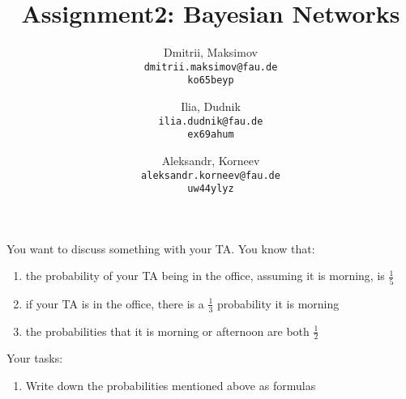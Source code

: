 \documentclass{homework}
\title{Assignment2: Bayesian Networks}
\author{
  Dmitrii, Maksimov\\
  \texttt{dmitrii.maksimov@fau.de} \\
  \texttt{ko65beyp}
  \and
  Ilia, Dudnik\\
  \texttt{ilia.dudnik@fau.de}\\
  \texttt{ex69ahum}
  \and
  Aleksandr, Korneev\\
  \texttt{aleksandr.korneev@fau.de}\\
  \texttt{uw44ylyz}
}
\begin{document}
\maketitle


You want to discuss something with your TA. You know that:
\begin{enumerate}
	\item the probability of your TA being in the office, assuming it is morning,  is $\frac{1}{5}$
	\item if your TA is in the office, there is a $\frac{1}{3}$ probability it is morning
	\item the probabilities that it is morning or afternoon are both $\frac{1}{2}$
\end{enumerate}
Your tasks:
\begin{enumerate}
	\item Write down the probabilities mentioned above as formulas


\end{enumerate}
\end{document}

